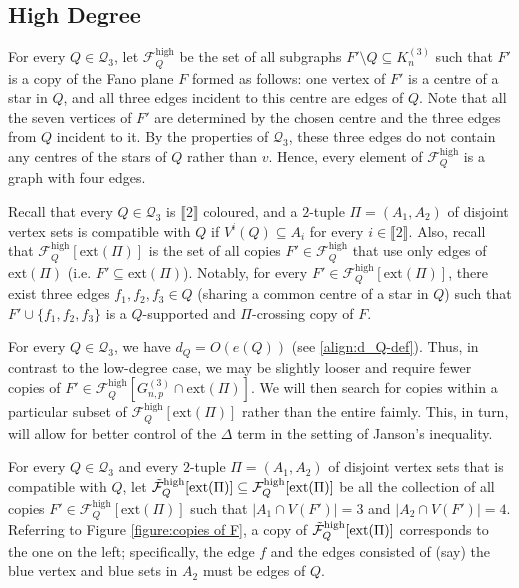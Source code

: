 \documentclass[11pt,a4paper,oneside,reqno]{amsart}
\newcommand{\Gnp}{G_{n, p}^{(3)}}
\newcommand{\cF}{\mathcal{F}}
\newcommand{\cQ}{\mathcal{Q}}
\newcommand{\1}{\mathbbm{1}} %
\newcommand{\br}[1]{\llbracket{#1}\rrbracket}
\newcommand{\cFQH}{\cF_Q^{\mathrm{high}}}
\newcommand{\cTFQH}{\Tilde{\cF}_Q^{\mathrm{high}}}
\newcommand{\ext}{\mathrm{ext}}
\begin{document}
\subsection{High Degree}\label{subsection:high degree}
For every $Q \in \cQ_3$, let $\cFQH$ be the set of all subgraphs $F' \setminus Q \subseteq K_n^{(3)}$ such that $F'$ is a copy of the Fano plane $F$ formed as follows: one vertex of $F'$ is a centre of a star in $Q$, and all three edges incident to this centre are edges of $Q$. Note that all the seven vertices of $F'$ are determined by the chosen centre and the three edges from $Q$ incident to it. By the properties of $\cQ_3$, these three edges do not contain any centres of the stars of $Q$ rather than $v$. Hence, every element of $\cFQH$ is a graph with four edges.

Recall that every $Q \in \cQ_3$ is $\br{2}$ coloured, and a $2$-tuple $\Pi = (A_1, A_2)$ of disjoint vertex sets is compatible with $Q$ if $V^i(Q) \subseteq A_i$ for every $i \in \br{2}$. Also, recall that $\cFQH[\ext(\Pi)]$ is the set of all copies $F' \in \cFQH$ that use only edges of $\ext(\Pi)$ (i.e. $F' \subseteq \ext(\Pi)$). Notably, for every $F' \in \cFQH[\ext(\Pi)]$, there exist three edges $f_1, f_2, f_3 \in Q$ (sharing a common centre of a star in $Q$) such that $F' \cup \{f_1, f_2, f_3\}$ is a $Q$-supported and $\Pi$-crossing copy of $F$.

For every $Q \in \cQ_3$, we have $d_Q = O(e(Q))$ (see \eqref{align:d_Q-def}). Thus, in contrast to the low-degree case, we may be slightly looser and require fewer copies of $F' \in \cFQH\left[\Gnp \cap \ext(\Pi)\right]$. We will then search for copies within a particular subset of $\cFQH[\ext(\Pi)]$ rather than the entire faimly. This, in turn, will allow for better control of the $\Delta$ term in the setting of Janson's inequality.

For every $Q \in \cQ_3$ and every $2$-tuple $\Pi = (A_1, A_2)$ of disjoint vertex sets that is compatible with $Q$, let $\cTFQH[\ext(\Pi)] \subseteq \cFQH[\ext(\Pi)]$ be all the collection of all copies $F' \in \cFQH[\ext(\Pi)]$ such that $|A_1 \cap V(F')| = 3$ and $|A_2 \cap V(F')| = 4$. Referring to Figure \ref{figure:copies of F}, a copy of $\cTFQH[\ext(\Pi)]$ corresponds to the one on the left; specifically, the edge $f$ and the edges consisted of (say) the blue vertex and blue sets in $A_2$ must be edges of $Q$.


    
\end{document}
